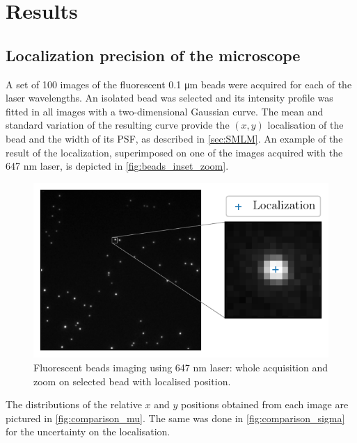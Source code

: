 \section{Results} \label{sec:results}
\subsection{Localization precision of the microscope} \label{sec:results_beads}
A set of 100 images of the fluorescent 0.1 \unit{\micro m} beads were acquired for each of the laser wavelengths.
An isolated bead was selected and its intensity profile was fitted in all images with a two-dimensional Gaussian curve. 
The mean and standard variation of the resulting curve provide the $(x,y)$ localisation of the bead and the width of its PSF, as described in \autoref{sec:SMLM}.
An example of the result of the localization, superimposed on one of the images acquired with the 647 nm laser, is depicted in \autoref{fig:beads_inset_zoom}.
%
\begin{figure}[hb]
    \centering
    \includegraphics[scale=1]{figures/beads_inset_zoom.pdf}
    \caption{Fluorescent beads imaging using 647 nm laser: whole acquisition  and zoom on selected bead with localised position.}
    \label{fig:beads_inset_zoom}
\end{figure}
%
The distributions of the relative $x$ and $y$ positions obtained from each image are pictured in \autoref{fig:comparison_mu}.
The same was done in \autoref{fig:comparison_sigma} for the uncertainty on the localisation.
%
